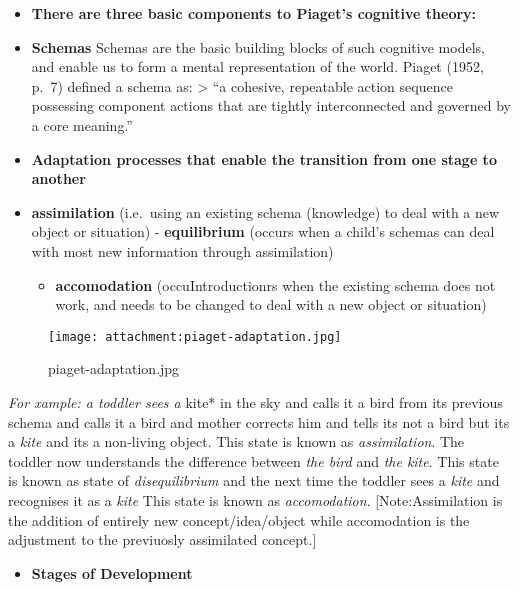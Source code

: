 \documentclass[11pt]{article}
\makeatletter
\def\maxwidth{\ifdim\Gin@nat@width>\linewidth\linewidth
    \else\Gin@nat@width\fi}
\let\Oldincludegraphics\includegraphics
\renewcommand{\includegraphics}[1]{\Oldincludegraphics[width=.8\maxwidth]{#1}}
\providecommand{\tightlist}{%
      \setlength{\itemsep}{0pt}\setlength{\parskip}{0pt}}
\makeatother
\begin{document}
\begin{itemize}
\item
  \textbf{There are three basic components to Piaget's cognitive
  theory:}
\item
  \textbf{Schemas} Schemas are the basic building blocks of such
  cognitive models, and enable us to form a mental representation of the
  world. Piaget (1952, p.~7) defined a schema as: \textgreater{} ``a
  cohesive, repeatable action sequence possessing component actions that
  are tightly interconnected and governed by a core meaning.''
\item
  \textbf{Adaptation processes that enable the transition from one stage
  to another}
\item
  \textbf{assimilation} (i.e.~using an existing schema (knowledge) to
  deal with a new object or situation) - \textbf{equilibrium} (occurs
  when a child's schemas can deal with most new information through
  assimilation)

  \begin{itemize}
  \tightlist
  \item
    \textbf{accomodation} (occuIntroductionrs when the existing schema
    does not work, and needs to be changed to deal with a new object or
    situation)
  \end{itemize}
\end{itemize}

\begin{figure}
\centering
\texttt{[image: attachment:piaget-adaptation.jpg]}
\caption{piaget-adaptation.jpg}
\end{figure}

\emph{For xample: a toddler sees a }kite* in the sky and calls it a bird
from its previous schema and calls it a bird and mother corrects him and
tells its not a bird but its a \emph{kite} and its a non-living object.
This state is known as \emph{assimilation}. The toddler now understands
the difference between \emph{the bird} and \emph{the kite}. This state
is known as state of \emph{disequilibrium} and the next time the toddler
sees a \emph{kite} and recognises it as a \emph{kite} This state is
known as \emph{accomodation}. {[}Note:Assimilation is the addition of
entirely new concept/idea/object while accomodation is the adjustment to
the previuosly assimilated concept.{]}

    \begin{itemize}
\tightlist
\item
  \textbf{Stages of Development}
\end{itemize}
\end{document}
